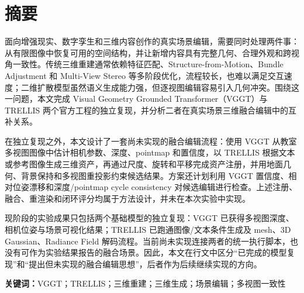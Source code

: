 \begin{center}
  {\heiti{}\bfseries \expFullTitle\par}
\end{center}
\vspace{1em}

\section*{\centering 摘要}

面向增强现实、数字孪生和三维内容创作的真实场景编辑，需要同时处理两件事：从有限图像中恢复可用的空间结构，并让新增内容具有完整几何、合理外观和跨视角一致性。传统三维重建通常依赖特征匹配、Structure-from-Motion、Bundle Adjustment 和 Multi-View Stereo 等多阶段优化，流程较长，也难以满足交互速度；二维扩散模型虽然语义生成能力强，但逐视图编辑容易引入几何冲突。围绕这一问题，本文完成 Visual Geometry Grounded Transformer（VGGT）与 TRELLIS 两个官方工程的独立复现，并分析二者在真实场景三维融合编辑中的互补关系。

在独立复现之外，本文设计了一套尚未实现的融合编辑流程：使用 VGGT 从教室多视图图像中估计相机参数、深度、pointmap 和置信度，以 TRELLIS 根据文本或参考图像生成三维资产，再通过尺度、旋转和平移完成资产注册，并用地面几何、背景保持和多视图重投影约束候选结果。方案还计划利用 VGGT 置信度、相对位姿漂移和深度/pointmap cycle consistency 对候选编辑进行检查。上述注册、融合、重渲染和闭环评分均属于方法设计，并未在本次实验中实现。

现阶段的实验成果只包括两个基础模型的独立复现：VGGT 已获得多视图深度、相机位姿与场景可视化结果；TRELLIS 已跑通图像/文本条件生成及 mesh、3D Gaussian、Radiance Field 解码流程。当前尚未实现连接两者的统一执行脚本，也没有可作为实验结果报告的融合场景。因此，本文在行文中区分“已完成的模型复现”和“提出但未实现的融合编辑思想”，后者作为后续继续实现的方向。

\vspace{\baselineskip}
\noindent\textbf{关键词：}VGGT；TRELLIS；三维重建；三维生成；场景编辑；多视图一致性

\newpage
